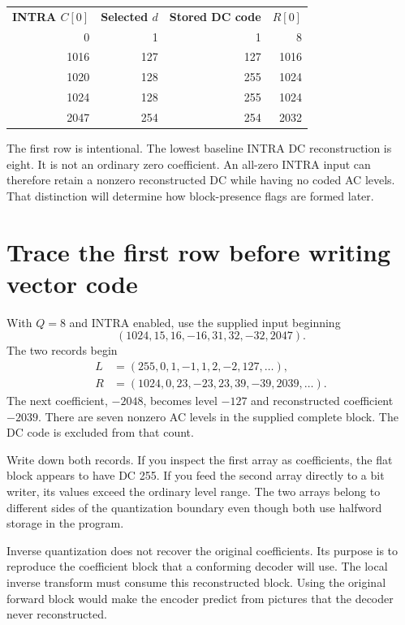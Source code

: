 \begin{center}
  \begin{tabular}{rrrr}
    \textbf{INTRA $C[0]$} & \textbf{Selected $d$} & \textbf{Stored DC code} & \textbf{$R[0]$} \\
    0                     & 1                     & 1                       & 8               \\
    1016                  & 127                   & 127                     & 1016            \\
    1020                  & 128                   & 255                     & 1024            \\
    1024                  & 128                   & 255                     & 1024            \\
    2047                  & 254                   & 254                     & 2032
  \end{tabular}
\end{center}
The first row is intentional. The lowest baseline INTRA DC reconstruction is
eight. It is not an ordinary zero coefficient. An all-zero INTRA input can
therefore retain a nonzero reconstructed DC while having no coded AC levels.
That distinction will determine how block-presence flags are formed later.

\section{Trace the first row before writing vector code}
With $Q=8$ and INTRA enabled, use the supplied input beginning
\[
  (1024,15,16,-16,31,32,-32,2047).
\]
The two records begin
\[
  \begin{aligned}
    L & =(255,0,1,-1,1,2,-2,127,\ldots),        \\
    R & =(1024,0,23,-23,23,39,-39,2039,\ldots).
  \end{aligned}
\]
The next coefficient, $-2048$, becomes
level $-127$ and reconstructed coefficient $-2039$. There are seven nonzero AC
levels in the supplied complete block. The DC code is excluded from that count.

Write down both records. If you inspect the first array as coefficients, the
flat block appears to have DC 255. If you feed the second array directly to a
bit writer, its values exceed the ordinary level range. The two arrays belong
to different sides of the quantization boundary even though both use halfword
storage in the program.

Inverse quantization does not recover the original coefficients. Its purpose is
to reproduce the coefficient block that a conforming decoder will use. The local
inverse transform must consume this reconstructed block. Using the original
forward block would make the encoder predict from pictures that the decoder
never reconstructed.
